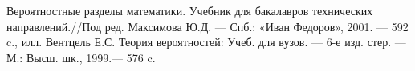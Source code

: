 \documentclass[main.tex]{subfiles}
\begin{document}
	\begin{thebibliography}{99}
		    Вероятностные разделы математики. Учебник для бакалавров технических направлений.//Под ред. Максимова Ю.Д. — Спб.: «Иван Федоров», 2001. — 592 c., илл.
		   Вентцель Е.С. Теория вероятностей: Учеб. для вузов. — 6-е изд. стер. — М.: Высш. шк., 1999.— 576 c.
	\end{thebibliography}
\end{document}
